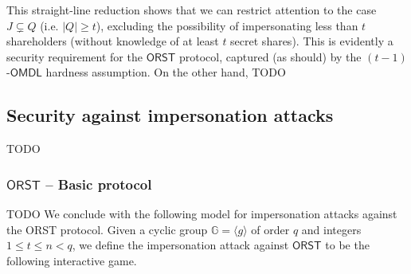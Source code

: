 \documentclass[psamsfonts, reqno]{amsart}
\theoremstyle{definition}
\theoremstyle{remark}
\numberwithin{equation}{section}
\begin{document}
This straight-line reduction shows that we can restrict attention
to the case $J \subsetneq Q$ (i.e. $|Q| \ge t$),
excluding the possibility of impersonating less than $t$
shareholders (without knowledge of at least $t$ secret shares).
This is evidently a security requirement for the $\mathsf{ORST}$
protocol, captured (as should) by the $(t-1)$-$\mathsf{OMDL}$
hardness assumption.
On the other hand, TODO

\subsection{Security against impersonation attacks}\label{section_security_imp}

TODO

\subsubsection{$\mathsf{ORST}$ -- Basic protocol}\label{section_orst_security_imp}

\noindent
TODO We conclude with the
following model for impersonation attacks against
the \textsf{ORST} protocol.
Given a cyclic group $\mathbb{G} = \langle g \rangle$ of order $q$
and integers $1 \le t \le n < q$, we define the impersonation attack
against $\textsf{ORST}$ to be the following interactive game.
\end{document}

